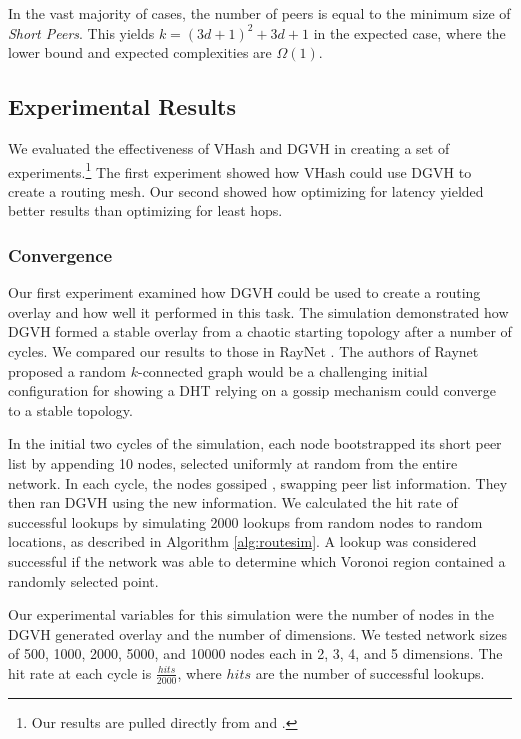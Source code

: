 In the vast majority of cases, the number of peers is equal to the minimum size of \textit{Short Peers}. 
This yields $k=(3d+1)^{2}+3d+1$ in the expected case, where the lower bound and expected complexities are $\Omega(1)$.



\subsection{Experimental Results}
We evaluated the effectiveness of VHash and DGVH in creating a set of experiments.\footnote{Our results are pulled directly from \cite{dgvh} and \cite{vhash}.}
The first experiment showed how VHash could use DGVH to create a routing mesh.
Our second showed how optimizing for latency yielded better results than optimizing for least hops.

\subsubsection{Convergence}
Our first experiment examined how DGVH could be used to create a routing overlay and how well it performed in this task.
The simulation demonstrated how DGVH  formed a stable overlay from a chaotic starting topology after a number of cycles.  
We compared our results to those in RayNet \cite{raynet}. 
The authors of Raynet proposed a random $k$-connected graph would be a challenging initial configuration for showing a DHT relying on a gossip mechanism could converge to a stable topology.

In the initial two cycles of the simulation, each node bootstrapped its short peer list by appending 10 nodes, selected uniformly at random from the entire network.
In each cycle, the nodes gossiped , swapping peer list information.
They then ran DGVH using the new information.
We calculated the hit rate of successful lookups by simulating 2000 lookups from random nodes to random locations, as described in Algorithm \ref{alg:routesim}.
A lookup was considered successful if the network was able to determine which Voronoi region contained a randomly selected point.

Our experimental variables for this simulation were the number of nodes in the DGVH generated overlay and the number of dimensions.  
We tested network sizes of 500, 1000, 2000, 5000, and 10000 nodes each in 2, 3, 4, and 5 dimensions.
The hit rate at each cycle is $\frac{hits}{2000}$, where $hits$ are the number of successful lookups.





